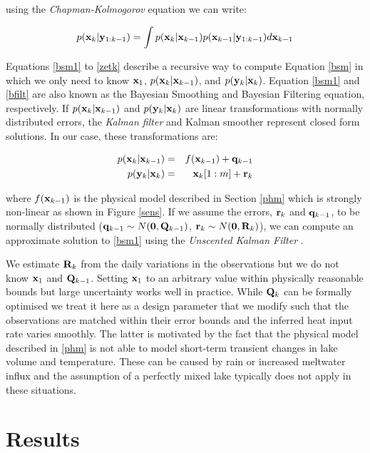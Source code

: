 \documentclass{bmc_template/bmcart}
\newcommand{\bm}[1]{{\bf #1}}
\begin{document}
using the \textit{Chapman-Kolmogorov} equation we can write:

\begin{equation}
p(\bm{x}_k|\bm{y}_{1:k-1}) = \int p(\bm{x}_k|\bm{x}_{k-1})p(\bm{x}_{k-1}|\bm{y}_{1:k-1})d\bm{x}_{k-1} 
\end{equation}

Equations \ref{bsm1} to \ref{zetk} describe a recursive way to compute Equation
\ref{bsm} in which we only need to know $\bm{x}_1$,
$p(\bm{x}_k|\bm{x}_{k-1})$, and $p(\bm{y}_k|\bm{x}_k)$. Equation \ref{bsm1} and
\ref{bfilt} are also known as the Bayesian Smoothing and Bayesian Filtering
equation, respectively. If $p(\bm{x}_k|\bm{x}_{k-1})$ and
$p(\bm{y}_k|\bm{x}_k)$ are linear transformations with normally distributed
errors, the \textit{Kalman filter} \cite{Kalman1960} and Kalman smoother
\cite{Rauch1965} represent closed form solutions. In our case, these
transformations are:

\begin{eqnarray}
p(\bm{x}_k|\bm{x}_{k-1}) & = & f(\bm{x}_{k-1}) + \bm{q}_{k-1} \\
    p(\bm{y}_k|\bm{x}_k) & = & \bm{x}_k[1:m] + \bm{r}_k   
\end{eqnarray}

where $f(\bm{x}_{k-1})$ is the physical model described in Section \ref{phm}
which is strongly non-linear as shown in Figure \ref{sens}. If we assume the errors, $\bm{r}_k$ and
$\bm{q}_{k-1}$, to be normally distributed ($\bm{q}_{k-1} \sim N(\bm{0},
\bm{Q}_{k-1})$, $\bm{r}_k \sim N(\bm{0}, \bm{R}_k)$), we can compute an
approximate solution to \ref{bsm1} using the \textit{Unscented Kalman Filter}
\citep{Merwe2004}.

We estimate $\bm{R}_k$ from the daily variations in the observations but we do
not know $\bm{x}_1$ and $\bm{Q}_{k-1}$. Setting $\bm{x}_1$ to an arbitrary value
within physically reasonable bounds but large uncertainty works well in practice.
While $\bm{Q}_{k}$ can be formally optimised we treat it here as a design
parameter that we modify such that the observations are matched within their
error bounds and the inferred heat input rate varies smoothly. The latter is
motivated by the fact that the physical model described in \ref{phm} is not
able to model short-term transient changes in lake volume and temperature.
These can be caused by rain or increased meltwater influx and the assumption
of a perfectly mixed lake typically does not apply in these situations.

\section*{Results}
\end{document}
